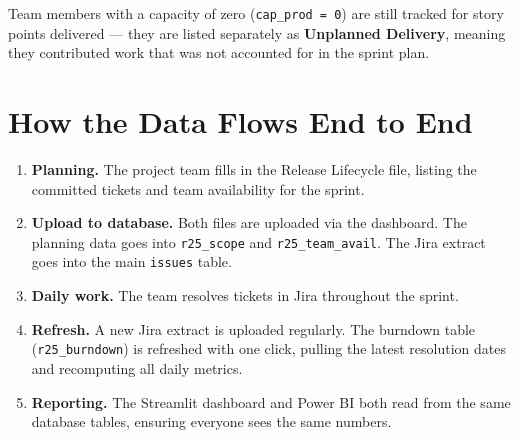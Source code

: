 \documentclass[12pt, a4paper]{article}
\begin{document}
Team members with a capacity of zero (\texttt{cap\_prod = 0}) are still
tracked for story points delivered --- they are listed separately as
\textbf{Unplanned Delivery}, meaning they contributed work that was not
accounted for in the sprint plan.

\section{How the Data Flows End to End}

\begin{enumerate}[leftmargin=*, label=\textbf{Step \arabic{enumi}.}]

  \item \textbf{Planning.}
        The project team fills in the Release Lifecycle file, listing the
        committed tickets and team availability for the sprint.

  \item \textbf{Upload to database.}
        Both files are uploaded via the dashboard. The planning data goes
        into \texttt{r25\_scope} and \texttt{r25\_team\_avail}. The Jira
        extract goes into the main \texttt{issues} table.

  \item \textbf{Daily work.}
        The team resolves tickets in Jira throughout the sprint.

  \item \textbf{Refresh.}
        A new Jira extract is uploaded regularly. The burndown table
        (\texttt{r25\_burndown}) is refreshed with one click, pulling the
        latest resolution dates and recomputing all daily metrics.

  \item \textbf{Reporting.}
        The Streamlit dashboard and Power BI both read from the same
        database tables, ensuring everyone sees the same numbers.

\end{enumerate}
\end{document}
